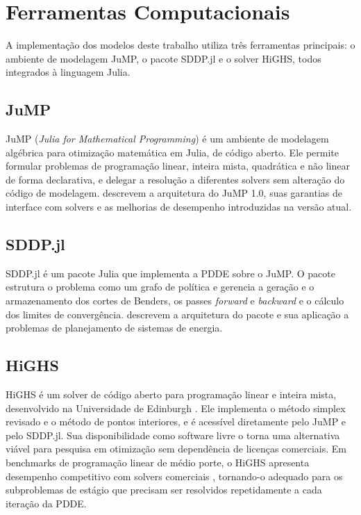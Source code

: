 \section{Ferramentas Computacionais}
\label{sec:ferramentas}

A implementação dos modelos deste trabalho utiliza três ferramentas principais: o ambiente de modelagem JuMP, o pacote SDDP.jl e o solver HiGHS, todos integrados à linguagem Julia.

\subsection{JuMP}
\label{subsec:jump}

JuMP (\emph{Julia for Mathematical Programming}) é um ambiente de modelagem algébrica para otimização matemática em Julia, de código aberto. Ele permite formular problemas de programação linear, inteira mista, quadrática e não linear de forma declarativa, e delegar a resolução a diferentes solvers sem alteração do código de modelagem.  descrevem a arquitetura do JuMP 1.0, suas garantias de interface com solvers e as melhorias de desempenho introduzidas na versão atual.

\subsection{SDDP.jl}
\label{subsec:sddp_jl}

SDDP.jl é um pacote Julia que implementa a PDDE sobre o JuMP. O pacote estrutura o problema como um grafo de política e gerencia a geração e o armazenamento dos cortes de Benders, os passes \textit{forward} e \textit{backward} e o cálculo dos limites de convergência.  descrevem a arquitetura do pacote e sua aplicação a problemas de planejamento de sistemas de energia.

\subsection{HiGHS}
\label{subsec:highs}

HiGHS é um solver de código aberto para programação linear e inteira mista, desenvolvido na Universidade de Edinburgh \cite{huangfu2018}. Ele implementa o método simplex revisado e o método de pontos interiores, e é acessível diretamente pelo JuMP e pelo SDDP.jl. Sua disponibilidade como software livre o torna uma alternativa viável para pesquisa em otimização sem dependência de licenças comerciais. Em benchmarks de programação linear de médio porte, o HiGHS apresenta desempenho competitivo com solvers comerciais \cite{huangfu2018}, tornando-o adequado para os subproblemas de estágio que precisam ser resolvidos repetidamente a cada iteração da PDDE.
